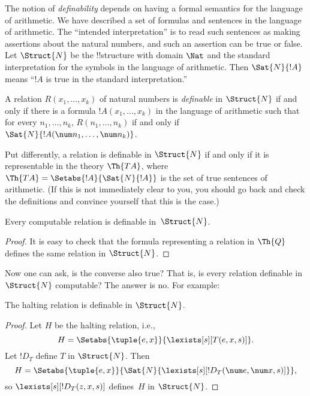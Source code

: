\documentclass[../../../include/open-logic-section]{subfiles}
\begin{document}

The notion of \emph{definability} depends on having a formal semantics
for the language of arithmetic.  We have described a set of formulas
and sentences in the language of arithmetic. The ``intended
interpretation'' is to read such sentences as making assertions about
the natural numbers, and such an assertion can be true or false. Let
$\Struct{N}$ be the !!{structure} with domain $\Nat$ and the standard
interpretation for the symbols in the language of arithmetic.  Then
$\Sat{N}{!A}$ means ``$!A$ is true in the standard interpretation.''

\begin{defn}
A relation $R(x_1,\dots,x_k)$ of natural numbers is \emph{definable}
in $\Struct{N}$ if and only if there is a formula $!A(x_1,\dots,x_k)$
in the language of arithmetic such that for every $n_1,\dots,n_k$,
$R(n_1,\dots,n_k)$ if and only if $\Sat{N}{!A(\num n_1,\dots,\num
  n_k)}$.
\end{defn}

Put differently, a relation is definable in $\Struct{N}$ if and
only if it is representable in the theory $\Th{TA}$, where $\Th{TA} =
\Setabs{!A}{\Sat{N}{!A}}$ is the set of true sentences of
arithmetic. (If this is not immediately clear to you, you should go
back and check the definitions and convince yourself that this is the
case.)

\begin{lem}
Every computable relation is definable in~$\Struct{N}$.
\end{lem}

\begin{proof}
It is easy to check that the formula representing a relation in
$\Th{Q}$ defines the same relation in $\Struct{N}$. 
\end{proof}

Now one can ask, is the converse also true?  That is, is every
relation definable in~$\Struct{N}$ computable? The answer is no. For
example:

\begin{lem}
The halting relation is definable in $\Struct{N}$.
\end{lem}

\begin{proof}
Let $H$ be the halting relation, i.e.,
\[
H = \Setabs{\tuple{e,x}}{\lexists[s][T(e, x, s)]}.
\]
Let $!D_T$ define $T$ in $\Struct{N}$. Then
\[
H = \Setabs{\tuple{e,x}}{\Sat{N}{\lexists[s][!D_T(\num e, \num x, s)]}},
\]
so $\lexists[s][!D_T(z, x, s)]$ defines~$H$ in $\Struct{N}$. 
\end{proof}
\end{document}
